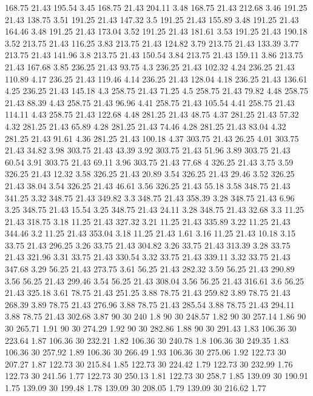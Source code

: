 168.75	21.43	195.54	3.45
168.75	21.43	204.11	3.48
168.75	21.43	212.68	3.46
191.25	21.43	138.75	3.51
191.25	21.43	147.32	3.5
191.25	21.43	155.89	3.48
191.25	21.43	164.46	3.48
191.25	21.43	173.04	3.52
191.25	21.43	181.61	3.53
191.25	21.43	190.18	3.52
213.75	21.43	116.25	3.83
213.75	21.43	124.82	3.79
213.75	21.43	133.39	3.77
213.75	21.43	141.96	3.8
213.75	21.43	150.54	3.84
213.75	21.43	159.11	3.86
213.75	21.43	167.68	3.85
236.25	21.43	93.75	4.3
236.25	21.43	102.32	4.24
236.25	21.43	110.89	4.17
236.25	21.43	119.46	4.14
236.25	21.43	128.04	4.18
236.25	21.43	136.61	4.25
236.25	21.43	145.18	4.3
258.75	21.43	71.25	4.5
258.75	21.43	79.82	4.48
258.75	21.43	88.39	4.43
258.75	21.43	96.96	4.41
258.75	21.43	105.54	4.41
258.75	21.43	114.11	4.43
258.75	21.43	122.68	4.48
281.25	21.43	48.75	4.37
281.25	21.43	57.32	4.32
281.25	21.43	65.89	4.28
281.25	21.43	74.46	4.28
281.25	21.43	83.04	4.32
281.25	21.43	91.61	4.36
281.25	21.43	100.18	4.37
303.75	21.43	26.25	4.01
303.75	21.43	34.82	3.98
303.75	21.43	43.39	3.92
303.75	21.43	51.96	3.89
303.75	21.43	60.54	3.91
303.75	21.43	69.11	3.96
303.75	21.43	77.68	4
326.25	21.43	3.75	3.59
326.25	21.43	12.32	3.58
326.25	21.43	20.89	3.54
326.25	21.43	29.46	3.52
326.25	21.43	38.04	3.54
326.25	21.43	46.61	3.56
326.25	21.43	55.18	3.58
348.75	21.43	341.25	3.32
348.75	21.43	349.82	3.3
348.75	21.43	358.39	3.28
348.75	21.43	6.96	3.25
348.75	21.43	15.54	3.25
348.75	21.43	24.11	3.28
348.75	21.43	32.68	3.3
11.25	21.43	318.75	3.18
11.25	21.43	327.32	3.21
11.25	21.43	335.89	3.22
11.25	21.43	344.46	3.2
11.25	21.43	353.04	3.18
11.25	21.43	1.61	3.16
11.25	21.43	10.18	3.15
33.75	21.43	296.25	3.26
33.75	21.43	304.82	3.26
33.75	21.43	313.39	3.28
33.75	21.43	321.96	3.31
33.75	21.43	330.54	3.32
33.75	21.43	339.11	3.32
33.75	21.43	347.68	3.29
56.25	21.43	273.75	3.61
56.25	21.43	282.32	3.59
56.25	21.43	290.89	3.56
56.25	21.43	299.46	3.54
56.25	21.43	308.04	3.56
56.25	21.43	316.61	3.6
56.25	21.43	325.18	3.61
78.75	21.43	251.25	3.88
78.75	21.43	259.82	3.89
78.75	21.43	268.39	3.89
78.75	21.43	276.96	3.88
78.75	21.43	285.54	3.88
78.75	21.43	294.11	3.88
78.75	21.43	302.68	3.87
90	30	240	1.8
90	30	248.57	1.82
90	30	257.14	1.86
90	30	265.71	1.91
90	30	274.29	1.92
90	30	282.86	1.88
90	30	291.43	1.83
106.36	30	223.64	1.87
106.36	30	232.21	1.82
106.36	30	240.78	1.8
106.36	30	249.35	1.83
106.36	30	257.92	1.89
106.36	30	266.49	1.93
106.36	30	275.06	1.92
122.73	30	207.27	1.87
122.73	30	215.84	1.85
122.73	30	224.42	1.79
122.73	30	232.99	1.76
122.73	30	241.56	1.77
122.73	30	250.13	1.81
122.73	30	258.7	1.85
139.09	30	190.91	1.75
139.09	30	199.48	1.78
139.09	30	208.05	1.79
139.09	30	216.62	1.77
